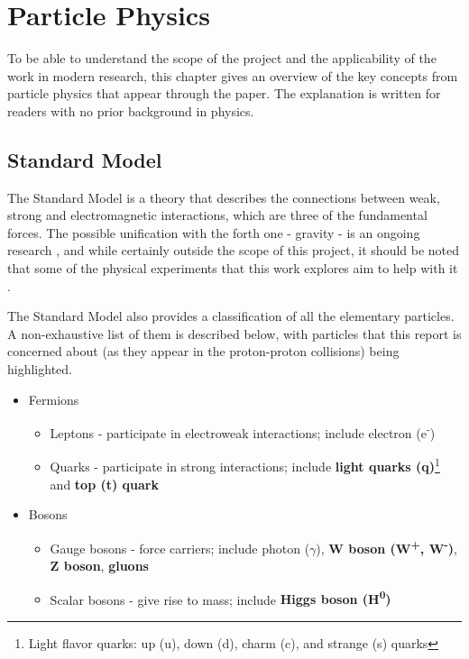 \section{Particle Physics}
To be able to understand the scope of the project and the applicability of the work in modern research, this chapter gives an overview of the key concepts from particle physics that appear through the paper. The explanation is written for readers with no prior background in physics.

\subsection{Standard Model}
The Standard Model is a theory that describes the connections between weak, strong and electromagnetic interactions, which are three of the fundamental forces. The possible unification with the forth one - gravity - is an ongoing research \cite{67-krasnov2018gravity}, and while certainly outside the scope of this project, it should be noted that some of the physical experiments that this work explores aim to help with it \cite{68-walz2015gbar,69-pagano2020gravity}.

The Standard Model also provides a classification of all the elementary particles. A non-exhaustive list of them is described below, with particles that this report is concerned about (as they appear in the proton-proton collisions) being highlighted.

\begin{itemize}[leftmargin=7mm]
  \item Fermions
  \begin{itemize}[leftmargin=5mm]
    \item Leptons - participate in electroweak interactions; include electron (e\textsuperscript{-})
    \item Quarks - participate in strong interactions; include \textbf{light quarks (q)}\footnote{Light flavor quarks: up (u), down (d), charm (c), and strange (s) quarks} and \textbf{top (t) quark}
  \end{itemize}
  \item Bosons
  \begin{itemize}[leftmargin=5mm]
    \item Gauge bosons - force carriers; include photon ($\gamma$), \textbf{W boson (W\textsuperscript{+}, W\textsuperscript{-})}, \textbf{Z boson}, \textbf{gluons}
    \item Scalar bosons - give rise to mass; include \textbf{Higgs boson (H\textsuperscript{0})}
  \end{itemize}
\end{itemize}

